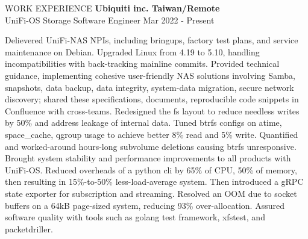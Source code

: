 \documentclass{resume} %
\begin{document}
\begin{rSection}{WORK EXPERIENCE} %
\textbf{Ubiquiti inc. \hfill Taiwan/Remote}
\\{UniFi-OS Storage Software Engineer \hfill Mar 2022 - Present}%
\begin{outline}
  \1 Delievered UniFi-NAS NPIs, including bringups, factory test plans, and service
maintenance on Debian.
    \2 Upgraded Linux from 4.19 to 5.10, handling incompatibilities with back-tracking mainline commits.
    \2 Provided technical guidance, implementing cohesive user-friendly NAS solutions involving Samba, snapshots, data backup, data integrity, system-data migration, secure network discovery; shared these specifications, documents, reproducible code snippets in Confluence with cross-teams.
  \1 Redesigned the fs layout to reduce needless writes by 50\% and address leakage of internal data.
  \1 Tuned btrfs configs on atime, space\_cache, qgroup usage to achieve
  better 8\% read and 5\% write.
  \1 Quantified and worked-around hours-long subvolume deletions causing btrfs unresponsive.
  \1 Brought system stability and performance improvements to all products with UniFi-OS.
  \1 Reduced overheads of a python cli by 65\% of CPU, 50\% of memory, then
  resulting in 15\%-to-50\% less-load-average system. Then introduced a gRPC state exporter for subscription and streaming.
  \1 Resolved an OOM due to socket buffers on a 64kB page-sized system,
  reducing 93\% over-allocation.
  \1 Assured software quality with tools such as golang test framework, xfstest, and packetdriller.
\end{outline}


\end{rSection}
\end{document}
